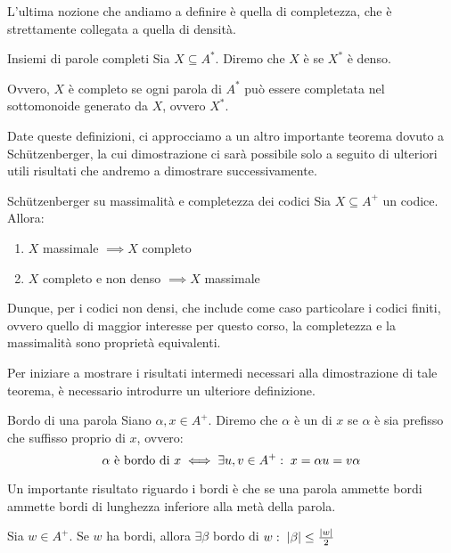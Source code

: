 L'ultima nozione che andiamo a definire è quella di completezza, che è strettamente collegata a quella di densità.
\begin{definition}{Insiemi di parole completi}
  Sia \(X \subseteq A^*\). Diremo che \(X\) è  se \(X^*\) è denso.

  Ovvero, \(X\) è completo se ogni parola di \(A^*\) può essere completata nel sottomonoide generato da \(X\), ovvero \(X^*\).
\end{definition}

Date queste definizioni, ci approcciamo a un altro importante teorema dovuto a Schützenberger, la cui dimostrazione ci sarà possibile solo a seguito di ulteriori utili risultati che andremo a dimostrare successivamente.

\begin{theorem}[label=thm:schutz_maximality_completeness]{Schützenberger su massimalità e completezza dei codici}
  Sia \(X \subseteq A^+\) un codice.
  Allora:
  \begin{enumerate}
    \item \(X\) massimale \(\implies X\) completo
    \item \(X\) completo e non denso \(\implies X\) massimale
  \end{enumerate}
\end{theorem}

Dunque, per i codici non densi, che include come caso particolare i codici finiti, ovvero quello di maggior interesse per questo corso, la completezza e la massimalità sono proprietà equivalenti.

Per iniziare a mostrare i risultati intermedi necessari alla dimostrazione di tale teorema, è necessario introdurre un ulteriore definizione.
\begin{definition}{Bordo di una parola}
  Siano \(\alpha,x \in A^+\). Diremo che \(\alpha\) è un  di \(x\) se \(\alpha\) è sia prefisso che suffisso proprio di \(x\), ovvero:
  \[\alpha \text{ è bordo di } x \iff \exists u,v \in A^+ :\; x = \alpha u = v \alpha\]
\end{definition}

Un importante risultato riguardo i bordi è che se una parola ammette bordi ammette bordi di lunghezza inferiore alla metà della parola.

\begin{proposition}[label=prop:if_border_exists_border_half_length]{}
  Sia \(w \in A^+\). Se \(w\) ha bordi, allora \(\exists \beta\) bordo di \(w :\; \left|\beta\right|\leq\frac{\left|w\right|}{2}\)
\end{proposition}


